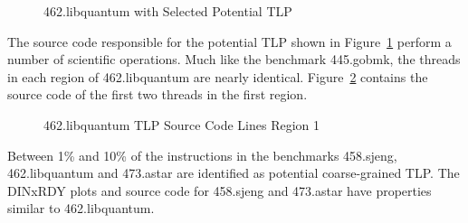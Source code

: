 \documentclass[defaultstyle,11pt]{thesis}
\begin{document}
\begin{figure}
  \centering
  \hspace{5mm}
  \caption{462.libquantum with Selected Potential TLP}
  \label{fig:462libquantumselInDoc}
\end{figure}

The source code responsible for the potential TLP shown in
Figure~\ref{fig:462libquantumselInDoc} perform a number of scientific
operations.  Much like the benchmark 445.gobmk, the threads in each
region of 462.libquantum are nearly identical.
Figure~\ref{fig:462libquantumsrcLinesR1} contains the source code of
the first two threads in the first region.

\begin{figure}
  \centering
  \subfigure[Thread 1]{{\small }}
  \hspace{5mm}
  \subfigure[Thread 2]{{\small }}
  \caption{462.libquantum TLP Source Code Lines Region 1}
  \label{fig:462libquantumsrcLinesR1}
\end{figure}

Between 1\% and 10\% of the instructions in the benchmarks 458.sjeng,
462.libquantum and 473.astar are identified as potential
coarse-grained TLP. The DINxRDY plots and source code for 458.sjeng
and 473.astar have properties similar to 462.libquantum.
\end{document}
